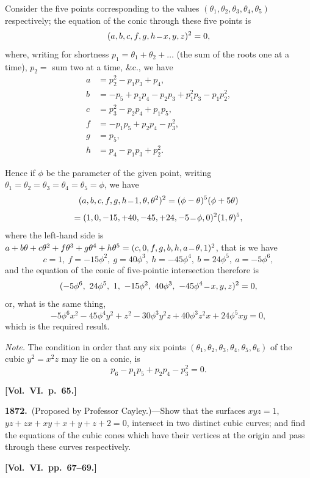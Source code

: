 \documentclass[11pt,a4paper]{article}
\theoremstyle{plain}
\theoremstyle{definition}
\theoremstyle{remark}
\begin{document}
Consider the five points corresponding to the values $(\theta_{1},\theta_{2},\theta_{3},\theta_{4},\theta_{5})$ respectively; the equation of the conic through these five points is
\[
(a,b,c,f,g,h\,\overline{\vrule width 6pt}\,x,y,z)^{2}=0,
\]
where, writing for shortness $p_{1}=\theta_{1}+\theta_{2}+\dots$ (the sum of the roots one at a time), $p_{2}=$ sum two at a time, \&c., we have
\begin{align*}
a &= p_{2}^{2}-p_{1}p_{3}+p_{4},\\
b &= -p_{5}+p_{1}p_{4}-p_{2}p_{3}+p_{1}^{2}p_{3}-p_{1}p_{2}^{2},\\
c &= p_{3}^{2}-p_{2}p_{4}+p_{1}p_{5},\\
f &= -p_{1}p_{5}+p_{2}p_{4}-p_{3}^{2},\\
g &= p_{5},\\
h &= p_{4}-p_{1}p_{3}+p_{2}^{2}.
\end{align*}

Hence if $\phi$ be the parameter of the given point, writing $\theta_{1}=\theta_{2}=\theta_{3}=\theta_{4}=\theta_{5}=\phi$, we have
\[
(a,b,c,f,g,h\,\overline{\vrule width 6pt}\,1,\theta,\theta^{2})^{2}=(\phi-\theta)^{5}(\phi+5\theta)
\]
\[
=(1,0,-15,+40,-45,+24,-5\,\overline{\vrule width 6pt}\,\phi,0)^{2}(1,\theta)^{5},
\]
where the left-hand side is $a+b\theta+c\theta^{2}+f\theta^{3}+g\theta^{4}+h\theta^{5}=(c,0,f,g,b,h,a\,\overline{\vrule width 6pt}\,\theta,1)^{2}$, that is we have
\[
c=1,\ f=-15\phi^{2},\ g=40\phi^{3},\ h=-45\phi^{4},\ b=24\phi^{5},\ a=-5\phi^{6},
\]
and the equation of the conic of five-pointic intersection therefore is
\[
(-5\phi^{6},\ 24\phi^{5},\ 1,\ -15\phi^{2},\ 40\phi^{3},\ -45\phi^{4}\,\overline{\vrule width 6pt}\,x,y,z)^{2}=0,
\]
or, what is the same thing,
\[
-5\phi^{6}x^{2}-45\phi^{4}y^{2}+z^{2}-30\phi^{3}y^{2}z+40\phi^{3}z^{2}x+24\phi^{5}xy=0,
\]
which is the required result.

\textit{Note.} The condition in order that any six points $(\theta_{1},\theta_{2},\theta_{3},\theta_{4},\theta_{5},\theta_{6})$ of the cubic $y^{2}=x^{2}z$ may lie on a conic, is
\[
p_{6}-p_{1}p_{5}+p_{2}p_{4}-p_{3}^{2}=0.
\]

\textbf{[Vol.\ VI.\ p.\ 65.]}

\textbf{1872.}\ (Proposed by Professor Cayley.)---Show that the surfaces $xyz=1$, $yz+zx+xy+x+y+z+2=0$, intersect in two distinct cubic curves; and find the equations of the cubic cones which have their vertices at the origin and pass through these curves respectively.

\textbf{[Vol.\ VI.\ pp.\ 67--69.]}
\end{document}
